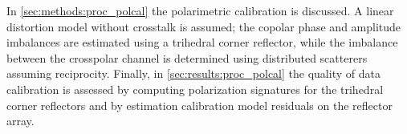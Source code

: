 In \autoref{sec:methods:proc_polcal} the polarimetric calibration is discussed. A linear distortion model without crosstalk is assumed; the copolar phase and amplitude imbalances are estimated using a trihedral corner reflector, while the imbalance between the crosspolar channel is determined using distributed scatterers assuming reciprocity. Finally, in \autoref{sec:results:proc_polcal} the quality of data calibration is assessed by computing polarization signatures for the trihedral corner reflectors and by estimation calibration model residuals on the reflector array. 
